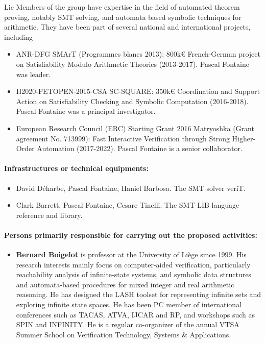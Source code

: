 \begin{sitedescription}{Lie}
Members of the group have expertise in the field of automated theorem proving, notably SMT solving, and automata based symbolic techniques for arithmetic.  They have been part of several national and international projects, including
\begin{itemize}
\item ANR-DFG SMArT (Programmes blancs 2013): 800k€ French-German project on Satisfiability Modulo Arithmetic Theories (2013-2017).  Pascal Fontaine was leader.
\item H2020-FETOPEN-2015-CSA SC-SQUARE: 350k€ Coordination and Support Action on Satisfiability Checking and Symbolic Computation (2016-2018).  Pascal Fontaine was a principal investigator.
\item European Research Council (ERC) Starting Grant 2016 Matryoshka (Grant
  agreement No. 713999): Fast Interactive Verification through Strong
  Higher-Order Automation (2017-2022).  Pascal Fontaine is a senior
  collaborator.
\end{itemize}

\paragraph{Infrastructures or technical equipments:}


\begin{itemize}
\item David Déharbe, Pascal Fontaine, Haniel Barbosa.  The SMT solver veriT.
\item Clark Barrett, Pascal Fontaine, Cesare Tinelli. The SMT-LIB language reference and library.
\end{itemize}

\paragraph{Persons primarily responsible for carrying out the proposed activities:}

\begin{itemize}
\item{\bf Bernard Boigelot} is professor at the University of Liège
  since 1999.  His research interests mainly focus on computer-aided
  verification, particularly reachability analysis of infinite-state
  systems, and symbolic data structures and automata-based procedures
  for mixed integer and real arithmetic reasoning.  He has designed
  the LASH toolset for representing infinite sets and exploring
  infinite state spaces. He has been PC member of international
  conferences such as TACAS, ATVA, IJCAR and RP, and workshops such as
  SPIN and INFINITY. He is a regular co-organizer of the annual VTSA
  Summer School on Verification Technology, Systems \& Applications.


\end{itemize}
\end{sitedescription}
